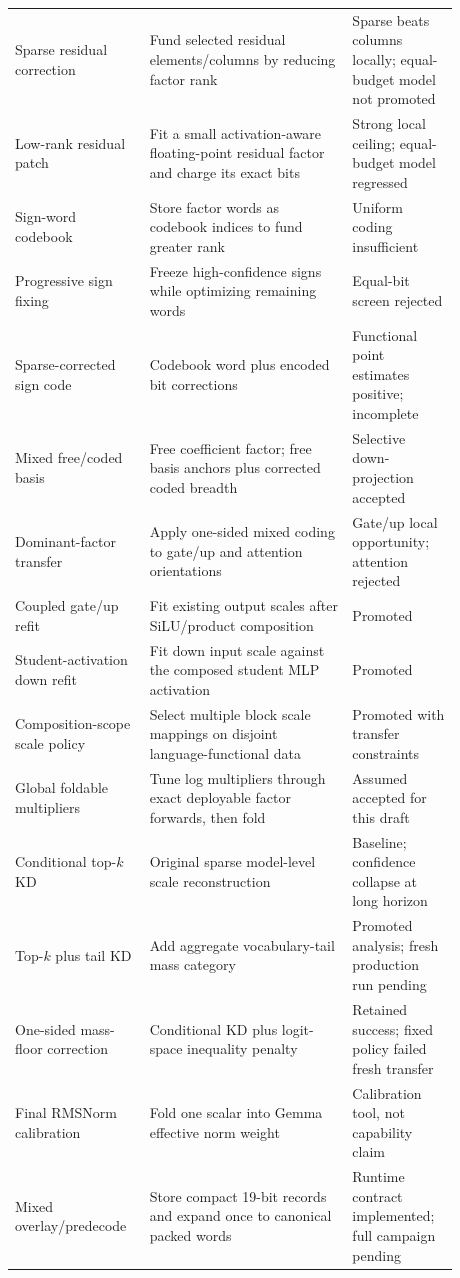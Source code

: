 \documentclass[10pt]{article}
\begin{document}
\begin{table}[h]
\begin{tabular}{p{0.24\linewidth}p{0.42\linewidth}p{0.22\linewidth}}
Sparse residual correction & Fund selected residual elements/columns by reducing factor rank & Sparse beats columns locally; equal-budget model not promoted \\
Low-rank residual patch & Fit a small activation-aware floating-point residual factor and charge its exact bits & Strong local ceiling; equal-budget model regressed \\
Sign-word codebook & Store factor words as codebook indices to fund greater rank & Uniform coding insufficient \\
Progressive sign fixing & Freeze high-confidence signs while optimizing remaining words & Equal-bit screen rejected \\
Sparse-corrected sign code & Codebook word plus encoded bit corrections & Functional point estimates positive; incomplete \\
Mixed free/coded basis & Free coefficient factor; free basis anchors plus corrected coded breadth & Selective down-projection accepted \\
Dominant-factor transfer & Apply one-sided mixed coding to gate/up and attention orientations & Gate/up local opportunity; attention rejected \\
Coupled gate/up refit & Fit existing output scales after SiLU/product composition & Promoted \\
Student-activation down refit & Fit down input scale against the composed student MLP activation & Promoted \\
Composition-scope scale policy & Select multiple block scale mappings on disjoint language-functional data & Promoted with transfer constraints \\
Global foldable multipliers & Tune log multipliers through exact deployable factor forwards, then fold & Assumed accepted for this draft \\
Conditional top-$k$ KD & Original sparse model-level scale reconstruction & Baseline; confidence collapse at long horizon \\
Top-$k$ plus tail KD & Add aggregate vocabulary-tail mass category & Promoted analysis; fresh production run pending \\
One-sided mass-floor correction & Conditional KD plus logit-space inequality penalty & Retained success; fixed policy failed fresh transfer \\
Final RMSNorm calibration & Fold one scalar into Gemma effective norm weight & Calibration tool, not capability claim \\
Mixed overlay/predecode & Store compact 19-bit records and expand once to canonical packed words & Runtime contract implemented; full campaign pending \\
\bottomrule
\end{tabular}
\end{table}
\end{document}
